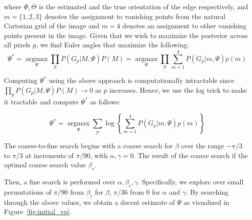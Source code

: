 \documentclass[a4paper]{article}
\begin{document}
	where $\Phi, \Theta$ is the estimated and the true orientation of the edge respectively, and $m=\{1,2,3\}$ denotes the assignment to vanishing points from the natural Cartesian grid of the image and $m={4}$ denotes an assignment to other vanishing points present in the image. Given that we wish to maximize the posterior across all pixels $p$, we find Euler angles that maximize the following:
	\begin{equation}
		\Psi^*=\underset{\Psi}{\operatorname{argmax}} \prod_p P(G_p|M,\Psi)P(M) = \underset{\Psi}{\operatorname{argmax}} \prod_{p} \sum_{m=1}^4 P\left(G_p|m, \Psi\right)p(m)
	\end{equation}
	
	Computing $\Psi^*$ using the above approach is computationally intractable since $\prod_p P(G_p|M,\Psi)P(M) \rightarrow 0$ as $p$ increases. Hence, we use the log trick to make it tractable and compute $\Psi^*$ as follows:
	
	\begin{equation}
		\Psi^{*}=\underset{\Psi}{\operatorname{argmax}} \sum_{p} \log\left\{\sum_{m=1}^{4} P\left(G_{p} | m, \Psi\right) p(m)\right\}
	\end{equation}
	
	The coarse-to-fine search begins with a coarse search for $\beta$ over the range $-\pi / 3$ to $\pi / 3$ at increments of $\pi / 90$, with $\alpha, \gamma = 0$. The result of the coarse search if the optimal coarse search value $\beta_c$.
	
	Then, a fine search is performed over $\alpha, \beta_c, \gamma$. Specifically, we explore over small permutations of $\pi / 90$ from $\beta_c$ for $\beta$,  $\pi / 36$ from $0$ for $\alpha$ and $\gamma$. By searching through the above values, we obtain a decent estimate of $\Psi$ as visualized in Figure~\ref{fig:initial_vp}.
	
\end{document}
